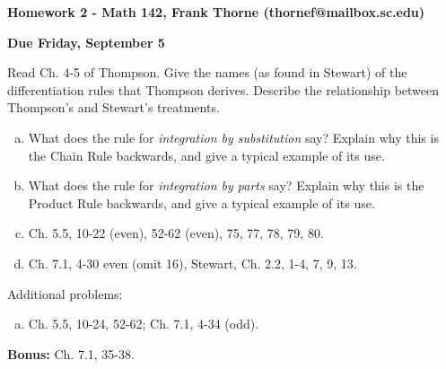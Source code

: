 \documentclass[12pt]{article}
\begin{document}
\setlength{\topmargin}{-2mm}





\begin{center}{\bf Homework 2 - Math 142, Frank Thorne (thornef@mailbox.sc.edu)}
\end{center}
\begin{center}
{\bf Due Friday, September 5}
\end{center}
Read Ch. 4-5 of Thompson. Give the names (as found in Stewart) of the differentiation
rules that Thompson derives. Describe the relationship between Thompson's and Stewart's
treatments.

\begin{enumerate}[(a)]
\item
What does the rule for {\itshape integration by substitution} say? Explain why this
is the Chain Rule backwards, and give a typical example of its use.

\item
What does the rule for {\itshape integration by parts} say? Explain why this is the
Product Rule backwards, and give a typical example of its use.

\item
Ch. 5.5, 10-22 (even), 52-62 (even), 75, 77, 78, 79, 80.

\item
Ch. 7.1, 4-30 even (omit 16), Stewart, Ch. 2.2, 1-4, 7, 9, 13.

\end{enumerate}

Additional problems:

\begin{enumerate}[(a)]
\item
Ch. 5.5, 10-24, 52-62; Ch. 7.1, 4-34 (odd).

\end{enumerate}
{\bf Bonus:} Ch. 7.1, 35-38.
\end{document}
